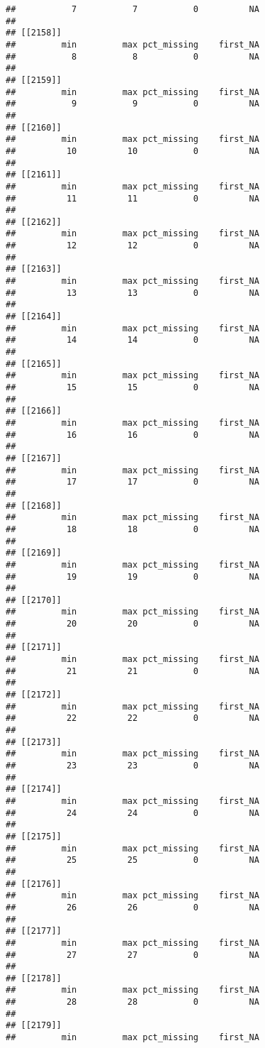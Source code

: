 \documentclass[
]{article}
\begin{document}
\begin{verbatim}
##           7           7           0          NA 
## 
## [[2158]]
##         min         max pct_missing    first_NA 
##           8           8           0          NA 
## 
## [[2159]]
##         min         max pct_missing    first_NA 
##           9           9           0          NA 
## 
## [[2160]]
##         min         max pct_missing    first_NA 
##          10          10           0          NA 
## 
## [[2161]]
##         min         max pct_missing    first_NA 
##          11          11           0          NA 
## 
## [[2162]]
##         min         max pct_missing    first_NA 
##          12          12           0          NA 
## 
## [[2163]]
##         min         max pct_missing    first_NA 
##          13          13           0          NA 
## 
## [[2164]]
##         min         max pct_missing    first_NA 
##          14          14           0          NA 
## 
## [[2165]]
##         min         max pct_missing    first_NA 
##          15          15           0          NA 
## 
## [[2166]]
##         min         max pct_missing    first_NA 
##          16          16           0          NA 
## 
## [[2167]]
##         min         max pct_missing    first_NA 
##          17          17           0          NA 
## 
## [[2168]]
##         min         max pct_missing    first_NA 
##          18          18           0          NA 
## 
## [[2169]]
##         min         max pct_missing    first_NA 
##          19          19           0          NA 
## 
## [[2170]]
##         min         max pct_missing    first_NA 
##          20          20           0          NA 
## 
## [[2171]]
##         min         max pct_missing    first_NA 
##          21          21           0          NA 
## 
## [[2172]]
##         min         max pct_missing    first_NA 
##          22          22           0          NA 
## 
## [[2173]]
##         min         max pct_missing    first_NA 
##          23          23           0          NA 
## 
## [[2174]]
##         min         max pct_missing    first_NA 
##          24          24           0          NA 
## 
## [[2175]]
##         min         max pct_missing    first_NA 
##          25          25           0          NA 
## 
## [[2176]]
##         min         max pct_missing    first_NA 
##          26          26           0          NA 
## 
## [[2177]]
##         min         max pct_missing    first_NA 
##          27          27           0          NA 
## 
## [[2178]]
##         min         max pct_missing    first_NA 
##          28          28           0          NA 
## 
## [[2179]]
##         min         max pct_missing    first_NA 

\end{verbatim}
\end{document}

